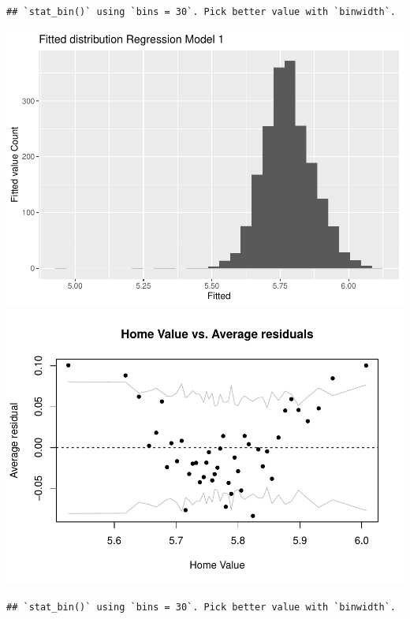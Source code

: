 \documentclass[
]{article}
\begin{document}
\begin{verbatim}
## `stat_bin()` using `bins = 30`. Pick better value with `binwidth`.
\end{verbatim}

\includegraphics{final-writeup_files/figure-latex/unnamed-chunk-6-1.pdf}
\includegraphics{final-writeup_files/figure-latex/unnamed-chunk-6-2.pdf}

\begin{verbatim}
## `stat_bin()` using `bins = 30`. Pick better value with `binwidth`.
\end{verbatim}
\end{document}

